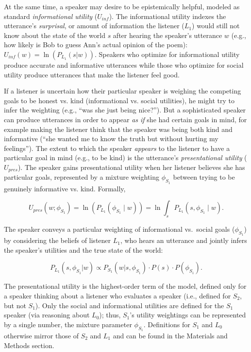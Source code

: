 \documentclass[9pt,twocolumn,twoside,lineno]{main_class_file}
\begin{document}
At the same time, a speaker may desire to be epistemically helpful, modeled as standard \emph{informational utility} (\(U_{inf}\)).
The informational utility indexes the utterance's \emph{surprisal}, or amount of information the listener (\(L_1\)) would still not know about the state of the world \(s\) after hearing the speaker's utterance \(w\) (e.g., how likely is Bob to guess Ann's actual opinion of the poem): \(U_{inf}(w) = \ln(P_{L_1}(s | w))\).
Speakers who optimize for informational utility produce accurate and informative utterances while those who optimize for social utility produce utterances that make the listener feel good.

If a listener is uncertain how their particular speaker is weighing the competing goals to be honest vs. kind (informational vs. social utilities), he might try to infer the weighting (e.g., ``was she just being nice?'').
But a sophisticated speaker can produce utterances in order to appear \emph{as if} she had certain goals in mind, for example making the listener think that the speaker was being both kind and informative (``she wanted me to know the truth but without hurting my feelings'').
The extent to which the speaker \emph{appears} to the listener to have a particular goal in mind (e.g., to be kind) is the utterance's \emph{presentational utility} (\(U_{pres}\)).
The speaker gains presentational utility when her listener believes she
has particular goals, represented by a mixture weighting \(\phi_{S_1}\) between trying to be genuinely informative vs. kind.
Formally,

\begin{equation}
U_{pres}(w; \phi_{S_1}) = \ln(P_{L_1}(\phi_{S_1} \mid w)) = \ln \int_s P_{L_1}(s, \phi_{S_1} \mid w).
\end{equation}

\noindent The speaker conveys a particular weighting of informational
vs.~social goals (\(\phi_{S_1}\)) by considering the
beliefs of listener \(L_1\), who hears an utterance and jointly infers
the speaker's utilities and the true state of the world:

\begin{equation}
P_{L_1}(s, \phi_{S_1} | w) \propto P_{S_1}(w | s, \phi_{S_1}) \cdot P(s) \cdot P(\phi_{S_1}).
\end{equation}

\noindent The presentational utility is the highest-order term of the model, defined only for a speaker thinking about a listener who evaluates a speaker
(i.e., defined for \(S_2\), but not \(S_1\)).
Only the social and informational utilities are defined for the \(S_1\) speaker (via reasoning about \(L_0\)); thus, \(S_1\)'s utility weightings can be represented by a single number, the mixture parameter \(\phi_{S_1}\).
Definitions for \(S_1\) and  \(L_0\) otherwise mirror those of  \(S_2\) and  \(L_1\) and can be found in the Materials and Methods section.
\end{document}
